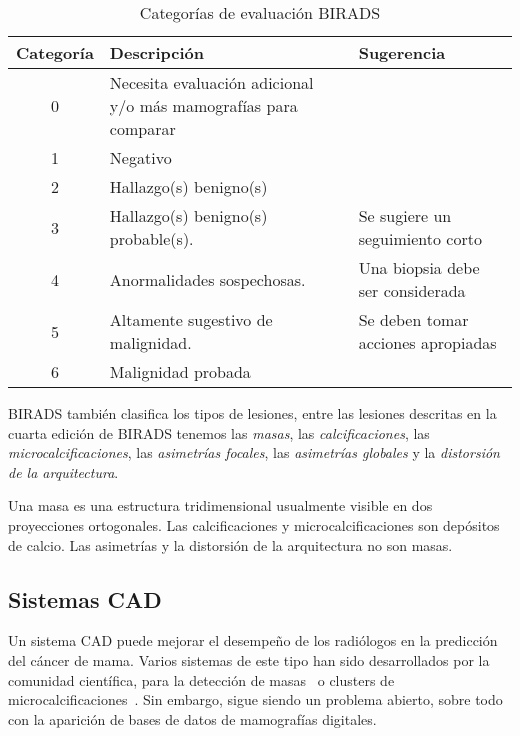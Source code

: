 \begin{table}
  \caption[Categorías de evaluación BIRADS]{Categorías de evaluación BIRADS}
  \label{birads}
\begin{center}
{\scriptsize
    \begin{tabular}{c | >{\centering\arraybackslash}m{1.8in} |
    >{\centering\arraybackslash}m{1.8in} }
    \hline
    {\bf Categoría} &
    {\bf Descripción} &
    {\bf Sugerencia} \\
    \hline
    0 & Necesita evaluación adicional y/o más mamografías para comparar&\\
    1 & Negativo&\\
    2 & Hallazgo(s) benigno(s)&\\
    3 & Hallazgo(s) benigno(s) probable(s). & Se sugiere un seguimiento corto\\
    4 & Anormalidades sospechosas. & Una biopsia debe ser considerada \\
    5 & Altamente sugestivo de malignidad. & Se deben tomar acciones apropiadas\\
    6 & Malignidad probada&\\
    \hline
    \end{tabular}
}
\end{center}
\end{table}

BIRADS también clasifica los tipos de lesiones, entre las lesiones descritas en
la cuarta edición de BIRADS tenemos las \textit{masas}, las
\textit{calcificaciones}, las \textit{microcalcificaciones}, las
\textit{asimetrías focales}, las \textit{asimetrías globales} y la
\textit{distorsión de la arquitectura}.

Una masa es una estructura tridimensional usualmente visible en dos
proyecciones ortogonales. Las calcificaciones y microcalcificaciones son
depósitos de calcio. Las asimetrías y la distorsión de la arquitectura no son
masas.

\subsection{Sistemas CAD}

Un sistema CAD puede mejorar el desempeño de los radiólogos en la predicción
del cáncer de mama. Varios sistemas de este tipo han sido desarrollados por la
comunidad científica, para la detección de masas~\cite{bellotti2006completely}
o clusters de microcalcificaciones~\cite{yu2000cad}. Sin embargo, sigue siendo
un problema abierto, sobre todo con la aparición de bases de datos de
mamografías digitales.

